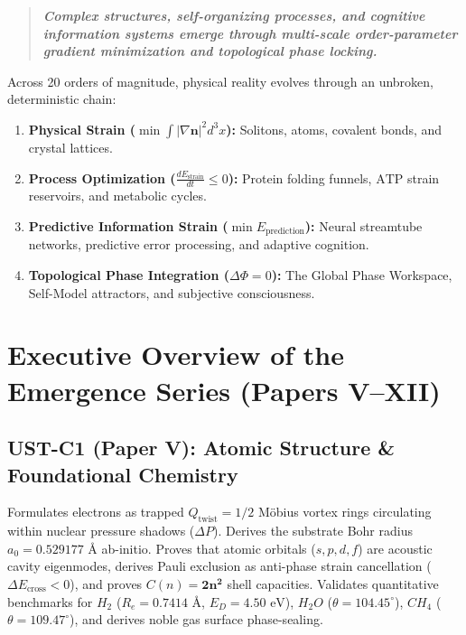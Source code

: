 \documentclass[11pt,a4paper]{article}
\begin{document}
	\begin{quote}
		\centering
		\textbf{\textit{Complex structures, self-organizing processes, and cognitive information systems emerge through multi-scale order-parameter gradient minimization and topological phase locking.}}
	\end{quote}
	
	Across 20 orders of magnitude, physical reality evolves through an unbroken, deterministic chain:
	\begin{enumerate}
		\item \textbf{Physical Strain ($\min \int |\nabla \mathbf{n}|^2 d^3x$):} Solitons, atoms, covalent bonds, and crystal lattices.
		\item \textbf{Process Optimization ($\frac{d E_{\text{strain}}}{dt} \le 0$):} Protein folding funnels, $\text{ATP}$ strain reservoirs, and metabolic cycles.
		\item \textbf{Predictive Information Strain ($\min E_{\text{prediction}}$):} Neural streamtube networks, predictive error processing, and adaptive cognition.
		\item \textbf{Topological Phase Integration ($\Delta \Phi = 0$):} The Global Phase Workspace, Self-Model attractors, and subjective consciousness.
	\end{enumerate}
	
	\section{Executive Overview of the Emergence Series (Papers V--XII)}
	\label{sec:emergence_overview}
	
	\subsection{UST-C1 (Paper V): Atomic Structure \& Foundational Chemistry}
	Formulates electrons as trapped $Q_{\text{twist}} = 1/2$ Möbius vortex rings circulating within nuclear pressure shadows ($\Delta P$). Derives the substrate Bohr radius $a_0 = \mathbf{0.529177 \text{ \AA}}$ ab-initio. Proves that atomic orbitals ($s, p, d, f$) are acoustic cavity eigenmodes, derives Pauli exclusion as anti-phase strain cancellation ($\Delta E_{\text{cross}} < 0$), and proves $C(n) = \mathbf{2n^2}$ shell capacities. Validates quantitative benchmarks for $H_2$ ($R_e = 0.7414 \text{ \AA}$, $E_D = 4.50 \text{ eV}$), $H_2O$ ($\theta = 104.45^\circ$), $CH_4$ ($\theta = 109.47^\circ$), and derives noble gas surface phase-sealing.
	
\end{document}
